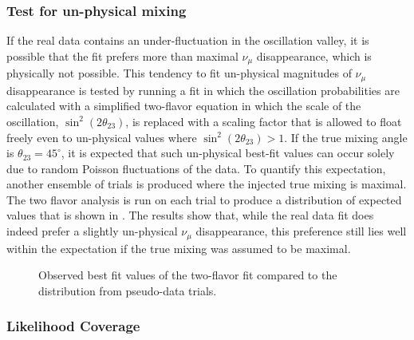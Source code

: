 \subsubsection{Test for un-physical mixing}
If the real data contains an under-fluctuation in the oscillation valley, it is possible that the fit prefers more than maximal $\nu_\mu$ disappearance, which is physically not possible. This tendency to fit un-physical magnitudes of $\nu_\mu$ disappearance is tested by running a fit in which the oscillation probabilities are calculated with a simplified two-flavor equation in which the scale of the oscillation, $\sin^2(2\theta_{23})$, is replaced with a scaling factor that is allowed to float freely even to un-physical values where $\sin^2(2\theta_{23}) > 1$. If the true mixing angle is $\theta_{23}=45^\circ$, it is expected that such un-physical best-fit values can occur solely due to random Poisson fluctuations of the data. To quantify this expectation, another ensemble of trials is produced where the injected true mixing is maximal. The two flavor analysis is run on each trial to produce a distribution of expected values that is shown in . The results show that, while the real data fit does indeed prefer a slightly un-physical $\nu_\mu$ disappearance, this preference still lies well within the expectation if the true mixing was assumed to be maximal.

\begin{figure}
    \centering
    
    \caption{Observed best fit values of the two-flavor fit compared to the distribution from pseudo-data trials.}
    \label{fig:two-flavor-ensemble}
\end{figure}

\subsubsection{Likelihood Coverage}

